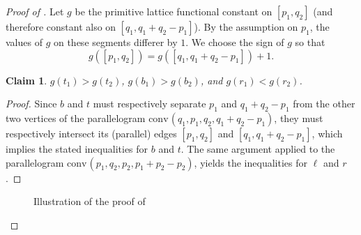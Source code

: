 \documentclass{amsart}
\theoremstyle{plain}
\newtheorem{claim}[theorem]{Claim}
\theoremstyle{definition}
\renewcommand{\vec}[1]{\overrightarrow#1}
\newcommand{\conv}{\ensuremath{\mathrm{conv}}\hspace{1pt}}
\begin{document}
\begin{proof}[Proof of ]
%
%
%

Let $g$ be the primitive lattice functional constant on $[p_1, q_2]$ (and therefore constant also on $[q_1, q_1+q_2-p_1]$). By the assumption on $p_1$, the values of $g$ on these segments differer by $1$. We choose the sign of $g$ so that 
\[
g([p_1, q_2])= g( [q_1, q_1+q_2-p_1]) +1. 
\]

\begin{claim}
\label{claim:g}
$g(t_1) > g(t_2)$, $g(b_1) > g(b_2)$, and $g(r_1) < g(r_2)$.
\end{claim}

\begin{proof}
Since $b$ and $t$ must respectively separate $p_1$ and $q_1+q_2-p_1$ from the other two vertices of the parallelogram $\conv(q_1, p_1, q_2, q_1+q_2-p_1)$, they must respectively intersect its (parallel) edges $[p_1, q_2]$ and $[q_1, q_1+q_2-p_1]$, which implies the stated inequalities for $b$ and $t$.
The same argument  applied to the parallelogram  $\conv(p_1, q_2, p_2, p_1+p_2-p_2)$, yields the inequalities for $\ell$ and $r$.
\end{proof}

\begin{figure}[htb]
\scalebox{.75}{}
\caption{Illustration of the proof of }
\label{fig:claim4}
\end{figure}



\end{proof}
\end{document}
